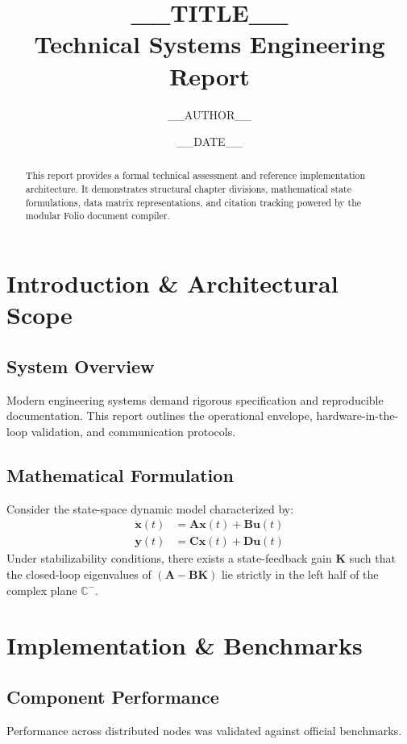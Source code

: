 \documentclass[11pt, a4paper]{report}
\title{\textbf{__TITLE__}\\ \large Technical Systems Engineering Report}
\author{__AUTHOR__}
\date{__DATE__}
\begin{document}
\maketitle

\begin{abstract}
This report provides a formal technical assessment and reference implementation architecture. It demonstrates structural chapter divisions, mathematical state formulations, data matrix representations, and citation tracking powered by the modular Folio document compiler.
\end{abstract}

\tableofcontents
\newpage

\chapter{Introduction \& Architectural Scope}

\section{System Overview}
Modern engineering systems demand rigorous specification and reproducible documentation. This report outlines the operational envelope, hardware-in-the-loop validation, and communication protocols.

\section{Mathematical Formulation}
Consider the state-space dynamic model characterized by:
\begin{align}
    \dot{\mathbf{x}}(t) &= \mathbf{A}\mathbf{x}(t) + \mathbf{B}\mathbf{u}(t) \\
    \mathbf{y}(t)       &= \mathbf{C}\mathbf{x}(t) + \mathbf{D}\mathbf{u}(t)
\end{align}
Under stabilizability conditions, there exists a state-feedback gain $\mathbf{K}$ such that the closed-loop eigenvalues of $(\mathbf{A} - \mathbf{B}\mathbf{K})$ lie strictly in the left half of the complex plane $\mathbb{C}^-$.

\chapter{Implementation \& Benchmarks}

\section{Component Performance}
Performance across distributed nodes was validated against official benchmarks.
\end{document}
